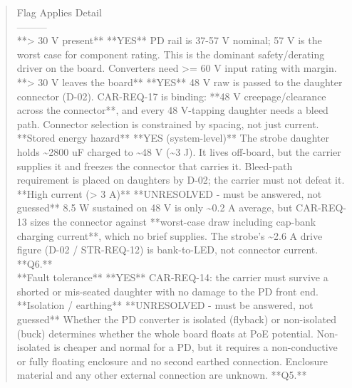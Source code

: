\documentclass[11pt,a4paper]{article}
\begin{document}
\begin{quote}\small\ttfamily\raggedright
\textbar{} Flag \textbar{} Applies \textbar{} Detail \textbar{}\\
\textbar{}---\textbar{}---\textbar{}---\textbar{}\\
\textbar{} {*}{*}\textgreater{} 30 V present{*}{*} \textbar{} {*}{*}YES{*}{*} \textbar{} PD rail is 37-57 V nominal; 57 V is the worst case for component rating. This is the dominant safety/derating driver on the board. Converters need \textgreater{}= 60 V input rating with margin. \textbar{}\\
\textbar{} {*}{*}\textgreater{} 30 V leaves the board{*}{*} \textbar{} {*}{*}YES{*}{*} \textbar{} 48 V raw is passed to the daughter connector (D-02). CAR-REQ-17 is binding: {*}{*}48 V creepage/clearance across the connector{*}{*}, and every 48 V-tapping daughter needs a bleed path. Connector selection is constrained by spacing, not just current. \textbar{}\\
\textbar{} {*}{*}Stored energy hazard{*}{*} \textbar{} {*}{*}YES (system-level){*}{*} \textbar{} The strobe daughter holds \textasciitilde{}2800 uF charged to \textasciitilde{}48 V (\textasciitilde{}3 J). It lives off-board, but the carrier supplies it and freezes the connector that carries it. Bleed-path requirement is placed on daughters by D-02; the carrier must not defeat it. \textbar{}\\
\textbar{} {*}{*}High current (\textgreater{} 3 A){*}{*} \textbar{} {*}{*}UNRESOLVED - must be answered, not guessed{*}{*} \textbar{} 8.5 W sustained on 48 V is only \textasciitilde{}0.2 A average, but CAR-REQ-13 sizes the connector against {*}{*}worst-case draw including cap-bank charging current{*}{*}, which no brief supplies. The strobe's \textasciitilde{}2.6 A drive figure (D-02 / STR-REQ-12) is bank-to-LED, not connector current. {*}{*}Q6.{*}{*} \textbar{}\\
\textbar{} {*}{*}Fault tolerance{*}{*} \textbar{} {*}{*}YES{*}{*} \textbar{} CAR-REQ-14: the carrier must survive a shorted or mis-seated daughter with no damage to the PD front end. \textbar{}\\
\textbar{} {*}{*}Isolation / earthing{*}{*} \textbar{} {*}{*}UNRESOLVED - must be answered, not guessed{*}{*} \textbar{} Whether the PD converter is isolated (flyback) or non-isolated (buck) determines whether the whole board floats at PoE potential. Non-isolated is cheaper and normal for a PD, but it requires a non-conductive or fully floating enclosure and no second earthed connection. Enclosure material and any other external connection are unknown. {*}{*}Q5.{*}{*} \textbar{}\\

\end{quote}
\end{document}
